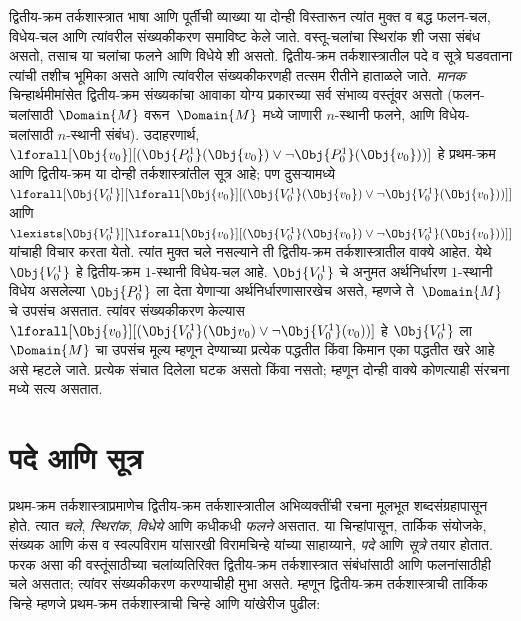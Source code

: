 द्वितीय-क्रम
तर्कशास्त्रात
भाषा आणि पूर्तीची
व्याख्या या दोन्ही
विस्तारून त्यांत
मुक्त व बद्ध
फलन-चल, विधेय-चल
आणि त्यांवरील
संख्यकीकरण
समाविष्ट केले
जाते.
वस्तू-चलांचा
स्थिरांक शी
जसा संबंध असतो,
तसाच या चलांचा
फलने
आणि विधेये
शी असतो.
द्वितीय-क्रम
तर्कशास्त्रातील
पदे व सूत्रे
घडवताना त्यांची
तशीच भूमिका
असते आणि
त्यांवरील
संख्यकीकरणही
तत्सम रीतीने
हाताळले जाते.
\emph{मानक}
चिन्हार्थमीमांसेत
द्वितीय-क्रम
संख्यकांचा
आवाका योग्य
प्रकारच्या सर्व
संभाव्य वस्तूंवर
असतो (फलन-चलांसाठी
$\Domain{M}$ वरून~$\Domain{M}$
मध्ये जाणारी
$n$-स्थानी फलने,
आणि विधेय-चलांसाठी
$n$-स्थानी संबंध).
उदाहरणार्थ,
$\lforall[\Obj{v_0}][(\Obj{P^1_0}(\Obj{v_0}) \lor \lnot
  \Obj{P^1_0}(\Obj{v_0}))]$
हे प्रथम-क्रम
आणि द्वितीय-क्रम
या दोन्ही
तर्कशास्त्रांतील
सूत्र आहे;
पण दुसऱ्यामध्ये
$\lforall[\Obj{V^1_0}][\lforall[\Obj{v_0}][(\Obj{V^1_0}(\Obj{v_0}) \lor
    \lnot \Obj{V^1_0}(\Obj{v_0}))]]$
आणि
$\lexists[\Obj{V^1_0}][\lforall[\Obj{v_0}][(\Obj{V^1_0}(\Obj{v_0}) \lor
    \lnot \Obj{V^1_0}(\Obj{v_0}))]]$
यांचाही विचार
करता येतो.
त्यांत मुक्त
चले नसल्याने
ती द्वितीय-क्रम
तर्कशास्त्रातील
वाक्ये
आहेत.
येथे $\Obj{V^1_0}$
हे द्वितीय-क्रम
$1$-स्थानी
विधेय-चल आहे.
$\Obj{V^1_0}$
चे अनुमत
अर्थनिर्धारण
$1$-स्थानी
विधेय
असलेल्या
$\Obj{P^1_0}$
ला देता येणाऱ्या
अर्थनिर्धारणासारखेच
असते, म्हणजे
ते~$\Domain{M}$
चे उपसंच असतात.
त्यांवर संख्यकीकरण
केल्यास
$\lforall[\Obj{v_0}][(\Obj{V^1_0}(\Obj v_0) \lor \lnot
  \Obj{V^1_0}(v_0))]$
हे $\Obj{V^1_0}$
ला~$\Domain{M}$
चा उपसंच मूल्य
म्हणून देण्याच्या
प्रत्येक पद्धतीत
किंवा किमान
एका पद्धतीत
खरे आहे असे
म्हटले जाते.
प्रत्येक संचात
दिलेला घटक
असतो किंवा
नसतो; म्हणून
दोन्ही वाक्ये
कोणत्याही
संरचना
मध्ये सत्य असतात.











\section{पदे आणि सूत्र}\label{sol:syn:frm:sec}

प्रथम-क्रम
तर्कशास्त्राप्रमाणेच
द्वितीय-क्रम
तर्कशास्त्रातील
अभिव्यक्तींची
रचना मूलभूत
शब्दसंग्रहापासून
होते. त्यात
\emph{चले},
\emph{स्थिरांक},
\emph{विधेये}
आणि कधीकधी
\emph{फलने}
असतात.
या चिन्हांपासून,
तार्किक संयोजके,
संख्यक आणि कंस
व स्वल्पविराम
यांसारखी
विरामचिन्हे
यांच्या साहाय्याने,
\emph{पदे} आणि
\emph{सूत्रे}
तयार होतात.
फरक असा की
वस्तूंसाठीच्या
चलांव्यतिरिक्त
द्वितीय-क्रम
तर्कशास्त्रात
संबंधांसाठी
आणि फलनांसाठीही
चले असतात;
त्यांवर
संख्यकीकरण
करण्याचीही
मुभा असते.
म्हणून द्वितीय-क्रम
तर्कशास्त्राची
तार्किक चिन्हे
म्हणजे प्रथम-क्रम
तर्कशास्त्राची
चिन्हे आणि
यांखेरीज पुढील:

